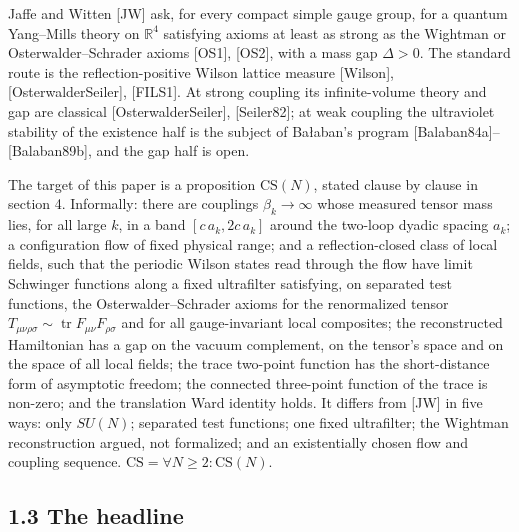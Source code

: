 \documentclass[10pt,letterpaper,twocolumn]{article}
\begin{document}
Jaffe and Witten {[}JW{]} ask, for every compact simple gauge group, for a quantum Yang--Mills theory on \(\mathbb R^4\) satisfying axioms at least as strong as the Wightman or Osterwalder--Schrader axioms {[}OS1{]}, {[}OS2{]}, with a mass gap \(\Delta>0\). The standard route is the reflection-positive Wilson lattice measure {[}Wilson{]}, {[}OsterwalderSeiler{]}, {[}FILS1{]}. At strong coupling its infinite-volume theory and gap are classical {[}OsterwalderSeiler{]}, {[}Seiler82{]}; at weak coupling the ultraviolet stability of the existence half is the subject of Bałaban's program {[}\allowbreak{}Balaban8\allowbreak{}4a{]}\allowbreak{}--{[}\allowbreak{}Balaban8\allowbreak{}9b{]}\allowbreak{}, and the gap half is open.

The target of this paper is a proposition \(\mathrm{CS}(N)\), stated clause by clause in section 4. Informally: there are couplings \(\beta_k\to\infty\) whose measured tensor mass lies, for all large \(k\), in a band \([c\,a_k,2c\,a_k]\) around the two-loop dyadic spacing \(a_k\); a configuration flow of fixed physical range; and a reflection-closed class of local fields, such that the periodic Wilson states read through the flow have limit Schwinger functions along a fixed ultrafilter satisfying, on separated test functions, the Osterwalder--Schrader axioms for the renormalized tensor \(T_{\mu\nu\rho\sigma}\sim\operatorname{tr}F_{\mu\nu}F_{\rho\sigma}\) and for all gauge-invariant local composites; the reconstructed Hamiltonian has a gap on the vacuum complement, on the tensor's space and on the space of all local fields; the trace two-point function has the short-distance form of asymptotic freedom; the connected three-point function of the trace is non-zero; and the translation Ward identity holds. It differs from {[}JW{]} in five ways: only \(SU(N)\); separated test functions; one fixed ultrafilter; the Wightman reconstruction argued, not formalized; and an existentially chosen flow and coupling sequence. \(\mathrm{CS}=\forall N\ge2:\mathrm{CS}(N)\).

\subsection{1.3 The headline}\label{13-the-headline}
\end{document}
